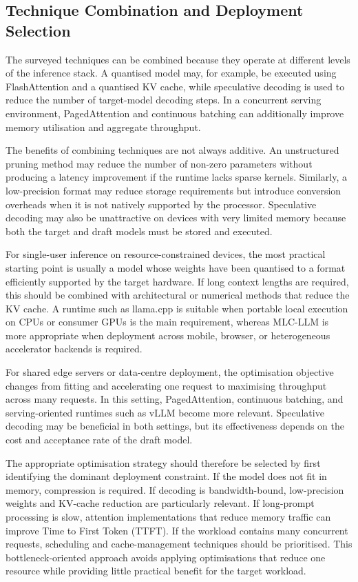 \subsection{Technique Combination and Deployment Selection}
\label{subsec:technique-combination}

The surveyed techniques can be combined because they operate at different 
levels of the inference stack. A quantised model may, for example, be executed 
using FlashAttention and a quantised KV cache, while speculative decoding is 
used to reduce the number of target-model decoding steps. In a concurrent 
serving environment, PagedAttention and continuous batching can additionally 
improve memory utilisation and aggregate throughput.

The benefits of combining techniques are not always additive. An unstructured 
pruning method may reduce the number of non-zero parameters without producing 
a latency improvement if the runtime lacks sparse kernels. Similarly, a 
low-precision format may reduce storage requirements but introduce conversion 
overheads when it is not natively supported by the processor. Speculative 
decoding may also be unattractive on devices with very limited memory because 
both the target and draft models must be stored and executed.

For single-user inference on resource-constrained devices, the most practical 
starting point is usually a model whose weights have been quantised to a format 
efficiently supported by the target hardware. If long context lengths are 
required, this should be combined with architectural or numerical methods that 
reduce the KV cache. A runtime such as llama.cpp is suitable when portable local 
execution on CPUs or consumer GPUs is the main requirement, whereas MLC-LLM is 
more appropriate when deployment across mobile, browser, or heterogeneous 
accelerator backends is required.

For shared edge servers or data-centre deployment, the optimisation objective 
changes from fitting and accelerating one request to maximising throughput 
across many requests. In this setting, PagedAttention, continuous batching, and 
serving-oriented runtimes such as vLLM become more relevant. Speculative 
decoding may be beneficial in both settings, but its effectiveness depends on 
the cost and acceptance rate of the draft model.

The appropriate optimisation strategy should therefore be selected by first 
identifying the dominant deployment constraint. If the model does not fit in 
memory, compression is required. If decoding is bandwidth-bound, low-precision 
weights and KV-cache reduction are particularly relevant. If long-prompt 
processing is slow, attention implementations that reduce memory traffic can 
improve Time to First Token (TTFT). If the workload contains many concurrent 
requests, scheduling and cache-management techniques should be prioritised. 
This bottleneck-oriented approach avoids applying optimisations that reduce one 
resource while providing little practical benefit for the target workload.

